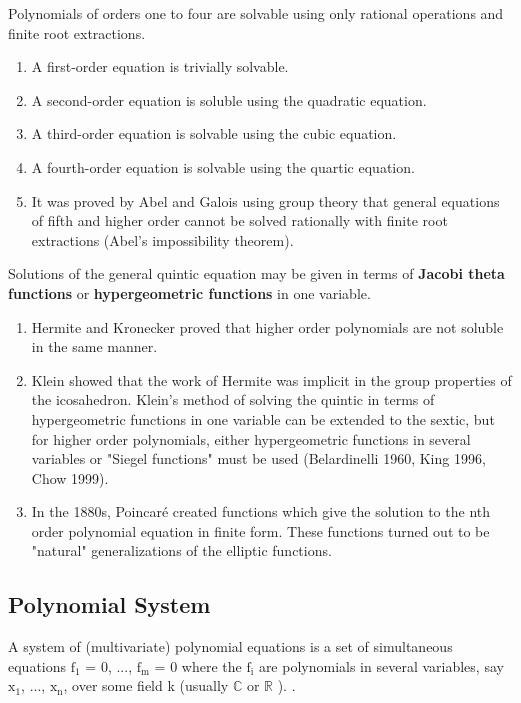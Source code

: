 \documentclass[11pt]{article}
\begin{document}
 Polynomials of orders one to four are solvable using only rational operations and finite root extractions. \cite{wolframPolynomial} 
\begin{enumerate}
\item A first-order equation is trivially solvable.
\item A second-order equation is soluble using the quadratic equation. 
\item A third-order equation is solvable using the cubic equation.
\item A fourth-order equation is solvable using the quartic equation.
\item It was proved by Abel and Galois using group theory that general equations of fifth and higher order cannot be solved rationally with finite root extractions (Abel's impossibility theorem).
\end{enumerate}

Solutions of the general quintic equation may be given in terms of \textbf{Jacobi theta functions} or \textbf{hypergeometric functions} in one variable.\cite{wolframPolynomial} 
\begin{enumerate}
\item Hermite and Kronecker proved that higher order polynomials are not soluble in the same manner.
\item Klein showed that the work of Hermite was implicit in the group properties of the icosahedron. Klein's method of solving the quintic in terms of hypergeometric functions in one variable can be extended to the sextic, but for higher order polynomials, either hypergeometric functions in several variables or "Siegel functions" must be used (Belardinelli 1960, King 1996, Chow 1999).
\item In the 1880s, Poincaré created functions which give the solution to the nth order polynomial equation in finite form. These functions turned out to be "natural" generalizations of the elliptic functions. 
\end{enumerate}

   


\subsection{Polynomial System}

A system of (multivariate) polynomial equations is a set of simultaneous equations $\mathrm{f_{1}}$  = 0, ..., $\mathrm{f_{m}}$ = 0 where the $\mathrm{f_{i}}$ are polynomials in several variables, say $\mathrm{x_{1}}$, ..., $\mathrm{x_{n}}$, over some field k (usually $\mathbb{C}$ or $\mathbb{R}$ ). 
\cite{wikipediaSystemofPolynomialEquations}.  
\end{document}
